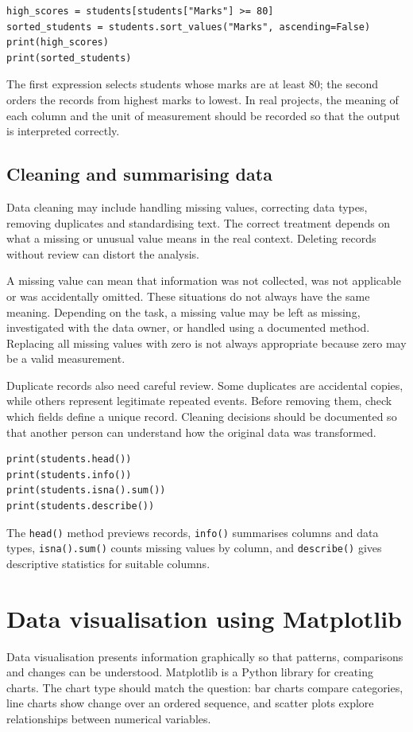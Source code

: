 \documentclass[11pt,openany,oneside]{book}
\begin{document}
\begin{lstlisting}[style=pythonstyle]
high_scores = students[students["Marks"] >= 80]
sorted_students = students.sort_values("Marks", ascending=False)
print(high_scores)
print(sorted_students)
\end{lstlisting}
The first expression selects students whose marks are at least 80; the second orders the records from highest marks to lowest. In real projects, the meaning of each column and the unit of measurement should be recorded so that the output is interpreted correctly.

\subsection{Cleaning and summarising data}
Data cleaning may include handling missing values, correcting data types, removing duplicates and standardising text. The correct treatment depends on what a missing or unusual value means in the real context. Deleting records without review can distort the analysis.

A missing value can mean that information was not collected, was not applicable or was accidentally omitted. These situations do not always have the same meaning. Depending on the task, a missing value may be left as missing, investigated with the data owner, or handled using a documented method. Replacing all missing values with zero is not always appropriate because zero may be a valid measurement.

Duplicate records also need careful review. Some duplicates are accidental copies, while others represent legitimate repeated events. Before removing them, check which fields define a unique record. Cleaning decisions should be documented so that another person can understand how the original data was transformed.

\begin{lstlisting}[style=pythonstyle]
print(students.head())
print(students.info())
print(students.isna().sum())
print(students.describe())
\end{lstlisting}
The \texttt{head()} method previews records, \texttt{info()} summarises columns and data types, \texttt{isna().sum()} counts missing values by column, and \texttt{describe()} gives descriptive statistics for suitable columns.

\section{Data visualisation using Matplotlib}
Data visualisation presents information graphically so that patterns, comparisons and changes can be understood. Matplotlib is a Python library for creating charts. The chart type should match the question: bar charts compare categories, line charts show change over an ordered sequence, and scatter plots explore relationships between numerical variables.
\end{document}
